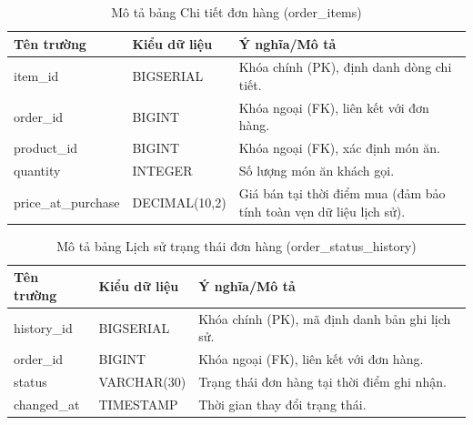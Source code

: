 \documentclass[../20232006p.tex]{subfiles}
\begin{document}
\begin{table}[H]
    \centering
    \caption{Mô tả bảng Chi tiết đơn hàng (order\_items)}
    \label{tab:order_items}
    \begin{tabular}{|p{3.5cm}|p{3cm}|p{7.5cm}|}
        \hline
        \textbf{Tên trường} & \textbf{Kiểu dữ liệu} & \textbf{Ý nghĩa/Mô tả}                                             \\
        \hline
        item\_id            & BIGSERIAL             & Khóa chính (PK), định danh dòng chi tiết.                          \\
        \hline
        order\_id           & BIGINT                & Khóa ngoại (FK), liên kết với đơn hàng.                            \\
        \hline
        product\_id         & BIGINT                & Khóa ngoại (FK), xác định món ăn.                                  \\
        \hline
        quantity            & INTEGER               & Số lượng món ăn khách gọi.                                         \\
        \hline
        price\_at\_purchase & DECIMAL(10,2)         & Giá bán tại thời điểm mua (đảm bảo tính toàn vẹn dữ liệu lịch sử). \\
        \hline
    \end{tabular}
\end{table}

\begin{table}[H]
    \centering
    \caption{Mô tả bảng Lịch sử trạng thái đơn hàng (order\_status\_history)}
    \label{tab:order_status_history}
    \begin{tabular}{|p{3cm}|p{3cm}|p{8cm}|}
        \hline
        \textbf{Tên trường} & \textbf{Kiểu dữ liệu} & \textbf{Ý nghĩa/Mô tả}                         \\
        \hline
        history\_id         & BIGSERIAL             & Khóa chính (PK), mã định danh bản ghi lịch sử. \\
        \hline
        order\_id           & BIGINT                & Khóa ngoại (FK), liên kết với đơn hàng.        \\
        \hline
        status              & VARCHAR(30)           & Trạng thái đơn hàng tại thời điểm ghi nhận.    \\
        \hline
        changed\_at         & TIMESTAMP             & Thời gian thay đổi trạng thái.                 \\
        \hline
    \end{tabular}
\end{table}
\end{document}
